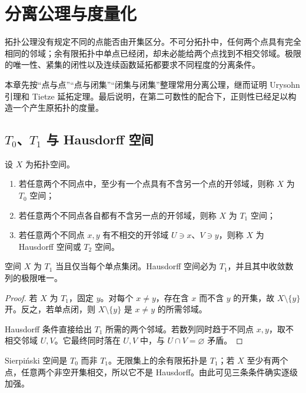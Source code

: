 \chapter{分离公理与度量化}
\label{chap:separation-metrization}

拓扑公理没有规定不同的点能否由开集区分。不可分拓扑中，任何两个点具有完全相同的邻域；余有限拓扑中单点已经闭，却未必能给两个点找到不相交邻域。极限的唯一性、紧集的闭性以及连续函数延拓都要求不同程度的分离条件。

本章先按“点与点”“点与闭集”“闭集与闭集”整理常用分离公理，继而证明 Urysohn 引理和 Tietze 延拓定理。最后说明，在第二可数性的配合下，正则性已经足以构造一个产生原拓扑的度量。

\section{\texorpdfstring{\(T_0\)、\(T_1\)}{T0、T1} 与 Hausdorff 空间}

\begin{definition}[低阶分离公理]
设 \(X\) 为拓扑空间。
\begin{enumerate}[label=\textup{(\roman*)}]
 \item 若任意两个不同点中，至少有一个点具有不含另一个点的开邻域，则称 \(X\) 为 \(T_0\) 空间；
 \item 若任意两个不同点各自都有不含另一点的开邻域，则称 \(X\) 为 \(T_1\) 空间；
 \item 若任意两个不同点 \(x,y\) 有不相交的开邻域 \(U\ni x\)、\(V\ni y\)，则称 \(X\) 为 Hausdorff 空间或 \(T_2\) 空间。
\end{enumerate}
\end{definition}

\begin{proposition}
\label{prop:t1-singletons-closed}
空间 \(X\) 为 \(T_1\) 当且仅当每个单点集闭。Hausdorff 空间必为 \(T_1\)，并且其中收敛数列的极限唯一。
\end{proposition}

\begin{proof}
若 \(X\) 为 \(T_1\)，固定 \(y\)。对每个 \(x\ne y\)，存在含 \(x\) 而不含 \(y\) 的开集，故 \(X\setminus\{y\}\) 开。反之，若单点闭，则 \(X\setminus\{y\}\) 是 \(x\ne y\) 的所需邻域。

Hausdorff 条件直接给出 \(T_1\) 所需的两个邻域。若数列同时趋于不同点 \(x,y\)，取不相交邻域 \(U,V\)。它最终同时落在 \(U,V\) 中，与 \(U\cap V=\varnothing\) 矛盾。
\end{proof}

Sierpiński 空间是 \(T_0\) 而非 \(T_1\)。无限集上的余有限拓扑是 \(T_1\)；若 \(X\) 至少有两个点，任意两个非空开集相交，所以它不是 Hausdorff。由此可见三条条件确实逐级加强。

